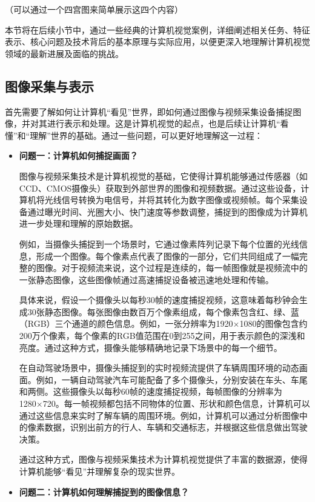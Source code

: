 （可以通过一个四宫图来简单展示这四个内容）

本节将在后续小节中，通过一些经典的计算机视觉案例，详细阐述相关任务、特征表示、核心问题及技术背后的基本原理与实际应用，以便更深入地理解计算机视觉领域的最新进展及面临的挑战。

\subsection{图像采集与表示}

首先需要了解如何让计算机“看见”世界，即如何通过图像与视频采集设备捕捉图像，并对其进行表示和处理。这是计算机视觉的起点，也是后续让计算机“看懂”和“理解”世界的基础。通过一些问题，可以更好地理解这一过程：

\begin{itemize}
    \item \textbf{问题一：计算机如何捕捉画面？}  

  图像与视频采集技术是计算机视觉的基础，它使得计算机能够通过传感器（如CCD、CMOS摄像头）获取到外部世界的图像和视频数据。通过这些设备，计算机将光线信号转换为电信号，并将其转化为数字图像或视频帧。每个采集设备通过曝光时间、光圈大小、快门速度等参数调整，捕捉到的图像成为计算机进一步处理和理解的原始数据。

    例如，当摄像头捕捉到一个场景时，它通过像素阵列记录下每个位置的光线信息，形成一个图像。每个像素点代表了图像的一部分，它们共同组成了一幅完整的图像。对于视频流来说，这个过程是连续的，每一帧图像就是视频流中的一张静态图像，这些图像帧通过高速捕捉设备被迅速地处理和传输。

    具体来说，假设一个摄像头以每秒30帧的速度捕捉视频，这意味着每秒钟会生成30张静态图像。每张图像由数百万个像素组成，每个像素包含红、绿、蓝（RGB）三个通道的颜色信息。例如，一张分辨率为1920×1080的图像包含约200万个像素，每个像素的RGB值范围在0到255之间，用于表示颜色的深浅和亮度。通过这种方式，摄像头能够精确地记录下场景中的每一个细节。

    在自动驾驶场景中，摄像头捕捉到的实时视频流提供了车辆周围环境的动态画面。例如，一辆自动驾驶汽车可能配备了多个摄像头，分别安装在车头、车尾和两侧。这些摄像头以每秒60帧的速度捕捉视频，每帧图像的分辨率为1280×720。每一帧视频都包括不同物体的位置、形状和颜色信息，计算机可以通过这些信息来实时了解车辆的周围环境。例如，计算机可以通过分析图像中的像素数据，识别出前方的行人、车辆和交通标志，并根据这些信息做出驾驶决策。

    通过这种方式，图像与视频采集技术为计算机视觉提供了丰富的数据源，使得计算机能够“看见”并理解复杂的现实世界。


\item \textbf{问题二：计算机如何理解捕捉到的图像信息？}  


\end{itemize}

